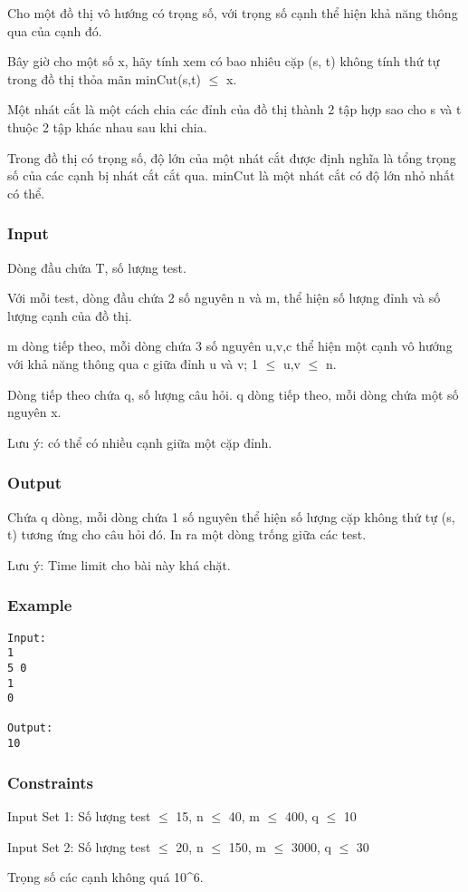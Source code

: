 



   Cho một đồ thị vô hướng có trọng số, với trọng số cạnh thể hiện khả năng thông qua của cạnh đó.  

   Bây giờ cho một số x, hãy tính xem có bao nhiêu cặp (s, t) không tính thứ tự trong đồ thị thỏa mãn minCut(s,t)  $\le$  x.  

   Một nhát cắt là một cách chia các đỉnh của đồ thị thành 2 tập hợp sao cho s và t thuộc 2 tập khác nhau sau khi chia.  

   Trong đồ thị có trọng số, độ lớn của một nhát cắt được định nghĩa là tổng trọng số của các cạnh bị nhát cắt cắt qua. minCut là một nhát cắt có độ lớn nhỏ nhất có thể.  

\subsubsection{   Input  }

   Dòng đầu chứa T, số lượng test.  

   Với mỗi test, dòng đầu chứa 2 số nguyên n và m, thể hiện số lượng đỉnh và số lượng cạnh của đồ thị.  

   m dòng tiếp theo, mỗi dòng chứa 3 số nguyên u,v,c thể hiện một cạnh vô hướng với khả năng thông qua c giữa đỉnh u và v; 1  $\le$  u,v  $\le$  n.  

   Dòng tiếp theo chứa q, số lượng câu hỏi. q dòng tiếp theo, mỗi dòng chứa một số nguyên x.  

   Lưu ý: có thể có nhiều cạnh giữa một cặp đỉnh.  

\subsubsection{   Output  }

   Chứa q dòng, mỗi dòng chứa 1 số nguyên thể hiện số lượng cặp không thứ tự (s, t) tương ứng cho câu hỏi đó. In ra một dòng trống giữa các test.  

   Lưu ý: Time limit cho bài này khá chặt.  

\subsubsection{   Example  }
\begin{verbatim}
Input:
1
5 0
1
0

Output:
10
\end{verbatim}

\subsubsection{   Constraints  }

   Input Set 1: Số lượng test  $\le$  15, n  $\le$  40, m  $\le$  400, q  $\le$  10  

   Input Set 2: Số lượng test  $\le$  20, n  $\le$  150, m  $\le$  3000, q  $\le$  30  

   Trọng số các cạnh không quá 10\textasciicircum6.  
